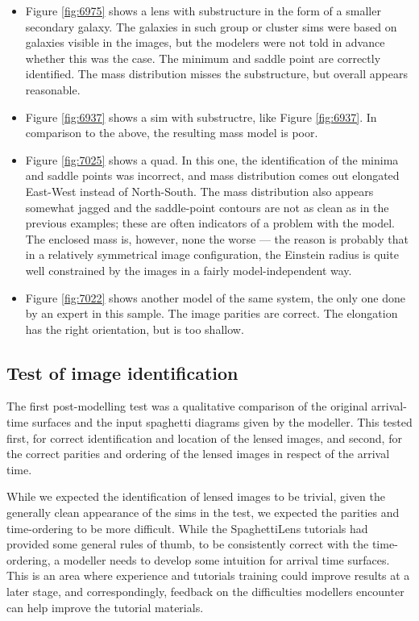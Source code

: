 \documentclass[usenatbib]{mn2e}
\newcommand{\spl}{SpaghettiLens\xspace}
\begin{document}
\begin{itemize}
\item Figure \ref{fig:6975} shows a lens with substructure in the form
  of a smaller secondary galaxy.  The galaxies in such group or
  cluster sims were based on galaxies visible in the images, but the
  modelers were not told in advance whether this was the case.  The
  minimum and saddle point are correctly identified.  The mass
  distribution misses the substructure, but overall appears
  reasonable.

\item Figure \ref{fig:6937} shows a sim with substructre, like
  Figure \ref{fig:6937}. In comparison to the above, the resulting mass
  model is poor.

\item Figure \ref{fig:7025} shows a quad.  In this one, the
  identification of the minima and saddle points was incorrect, and
  mass distribution comes out elongated East-West instead of
  North-South.  The mass distribution also appears somewhat jagged and
  the saddle-point contours are not as clean as in the previous
  examples; these are often indicators of a problem with the model.
  The enclosed mass is, however, none the worse --- the reason is
  probably that in a relatively symmetrical image configuration, the
  Einstein radius is quite well constrained by the images in a fairly
  model-independent way.

\item Figure \ref{fig:7022} shows another model of the same system, the
  only one done by an expert in this sample. The image parities are
  correct. The elongation has the right orientation, but is too shallow.

\end{itemize}



\subsection{Test of image identification} \label{sec:tests.t1}

The first post-modelling test was a qualitative comparison of the
original arrival-time surfaces and the input spaghetti diagrams given
by the modeller.  This tested first, for correct identification and
location of the lensed images, and second, for the correct parities and
ordering of the lensed images in respect of the arrival time.

While we expected the identification of lensed images to be trivial,
given the generally clean appearance of the sims in the test, we
expected the parities and time-ordering to be more difficult.  While
the \spl tutorials had provided some general rules of thumb, to be
consistently correct with the time-ordering, a modeller needs to
develop some intuition for arrival time surfaces.  This is an area
where experience and tutorials training could improve results at a
later stage, and correspondingly, feedback on the difficulties
modellers encounter can help improve the tutorial materials.
\end{document}
